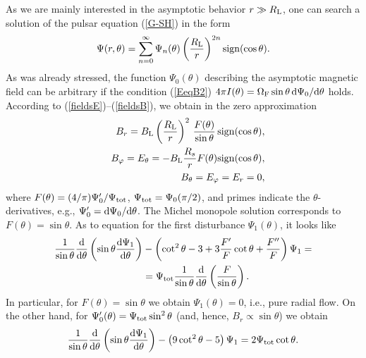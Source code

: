 \documentclass[useAMS,usenatbib]{mn2e}
\def\th{\theta}
\begin{document}
As we are mainly interested in the asymptotic behavior $r \gg R_{\rm L}$, one can search
a solution of the pulsar equation (\ref{G-SH}) in the form
\begin{equation}
\Psi(r,\theta) = \sum\limits_{n=0}^{\infty}\Psi_{n}(\theta)
\left(\dfrac{R_{\rm L}}{r}\right)^{2n}\mathrm{sign}(\cos\theta).
\label{dPsi}
\end{equation}
As was already stressed, the function $\Psi_{0}(\theta)$ describing the asymptotic 
magnetic field can be arbitrary if the condition (\ref{EeqB2})
$4 \pi I(\theta) = \Omega_{\rm F} \sin\theta \, {\rm d}\Psi_{0}/{\rm d}\theta$ holds.
According to (\ref{fieldsE})--(\ref{fieldsB}), we obtain in the zero approximation
\begin{eqnarray}
&&B_r  =  B_{\rm L}\left(\frac{R_{\rm L}}{r}\right)^2 \,
\frac{F(\theta)}{\sin\theta} \, \mathrm{sign}(\cos\theta),
\label{BRr} \\
&&B_{\varphi} =  E_{\theta} = -B_{\rm L}\frac{R_s}{r}F(\theta) \mathrm{sign}(\cos\theta),
\label{Ett} \\
&&B_{\theta}  = E_{\varphi}=E_{r}=0,
\end{eqnarray}
where $F(\theta) = (4/\pi)\Psi_0'/\Psi_{\rm tot}$, $\Psi_{\rm tot}=\Psi_{0}(\pi/2)$, 
and primes indicate the $\theta$-derivatives, e.g., $\Psi_0' = {\rm d}\Psi_0/{\rm d}\theta$. 
The Michel monopole solution corresponds to $F(\theta) = \sin\theta$. As to equation for 
the first disturbance $\Psi_{1}(\theta)$, it looks like
\begin{align}
\frac{1}{\sin\theta}\frac{\mathrm{d}}{\mathrm{d}\theta}
\left(\sin\theta\frac{\mathrm{d}\Psi_1}{\mathrm{d}\theta}\right)
&- \left(\cot^2\th-3 +
 3\frac{F'}{F}\cot\theta+\frac{F''}{F}\right)\Psi_1 =\nonumber\\ 
&= \Psi_{\rm tot}\frac{1}{\sin\theta}
\frac{\mathrm{d}}{\mathrm{d}\theta}\left(\frac{F}{\sin\theta}\right).
\end{align}
In particular, for $F(\theta) = \sin\theta$ we obtain $\Psi_{1}(\theta) = 0$, i.e., 
pure radial flow. On the other hand, for $\Psi_{0}'(\theta) =\Psi_{\rm tot} \sin^2\theta$ (and, hence, 
$B_{r} \propto \sin\theta$) we obtain
\begin{eqnarray}
\frac{1}{\sin\theta}\frac{\mathrm{d}}{\mathrm{d}\theta}
\left(\sin\theta\frac{\mathrm{d}\Psi_1}{\mathrm{d}\theta}\right)
- \left(9\cot^2\th-5\right)\Psi_1
= 2\Psi_{\rm tot}\cot\theta.
\label{Psi1}
\end{eqnarray}
\end{document}
